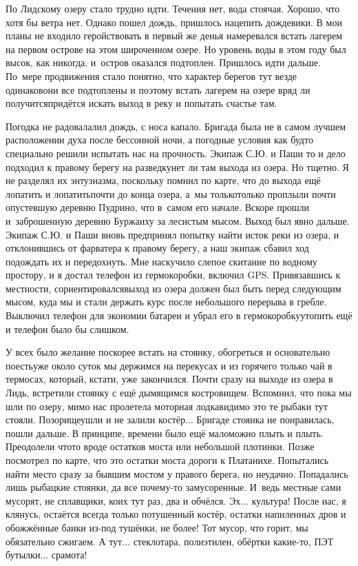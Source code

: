 По Лидскому озеру стало трудно идти. Течения нет, вода стоячая. Хорошо, что хотя бы ветра нет. Однако пошел дождь, пришлось нацепить дождевики. В мои планы не входило геройствовать в первый же день\mdash я намеревался встать лагерем на первом острове на этом широченном озере. Но уровень воды в этом году был высок, как никогда, и~остров оказался подтоплен. Пришлось идти дальше. По~мере продвижения стало понятно, что характер берегов тут везде одинаков\mdash они все подтоплены и поэтому встать лагерем на озере вряд ли получится\mdash придётся искать выход в реку и попытать счастье там. 

Погодка не радовала\mdash лил дождь, с носа капало. Бригада была не в самом лучшем расположении духа после бессонной ночи, а погодные условия как будто специально решили испытать нас на прочность. Экипаж С.Ю. и Паши то и дело подходил к правому берегу на разведку\mdash нет ли там выхода из озера. Но тщетно. Я не разделял их энтузиазма, поскольку помнил по карте, что до выхода ещё лопатить и лопатить\mdash почти до конца озера, а~мы только\sdash только проплыли почти опустевшую деревню Пудрино, что в~самом его начале. Вскоре прошли и~заброшенную деревню Буржаиху за лесистым мысом. Выход был явно дальше. Экипаж С.Ю. и Паши вновь предпринял попытку найти исток реки из озера, и отклонившись от фарватера к правому берегу, а наш экипаж сбавил ход подождать их и передохнуть. Мне наскучило слепое скитание по водному простору, и я достал телефон из гермокоробки, включил GPS. Привязавшись к местности, сориентировался\mdash выход из озера должен был быть перед следующим мысом, куда мы и стали держать курс после небольшого перерыва в гребле. Выключил телефон для экономии батареи и убрал его в гермокоробку\mdash утопить ещё и телефон было бы слишком.

У всех было желание поскорее встать на стоянку, обогреться и основательно поесть\mdash уже около суток мы держимся на перекусах и из горячего только чай в термосах, который, кстати, уже закончился. Почти сразу на выходе из озера в Лидь, встретили стоянку с ещё дымящимся костровищем. Вспомнил, что пока мы шли по озеру, мимо нас пролетела моторная лодка\mdash видимо это те рыбаки тут стояли. Позорище\mdash ушли и не залили костёр$\ldots$ Бригаде стоянка не понравилась, пошли дальше. В принципе, времени было ещё мало\mdash можно плыть и плыть. Преодолели что\sdash то вроде остатков моста или небольшой плотинки. Позже посмотрел по карте, что это остатки моста дороги к Платанихе. Попытались найти место сразу за бывшим мостом у правого берега, но неудачно. Попадались лишь рыбацкие стоянки, да все почему-то замусоренные. И~ведь местные сами мусорят, не сплавщики, коих тут раз, два и обчёлся. Эх$\ldots$ культура! После нас, я клянусь, остаётся всегда только потушенный костёр, остатки напиленных дров и обожжённые банки из-под тушёнки, не более! Тот мусор, что горит, мы обязательно сжигаем. А тут$\ldots$ стеклотара, полиэтилен, обёртки какие-то, ПЭТ бутылки$\ldots$ срамота! 

